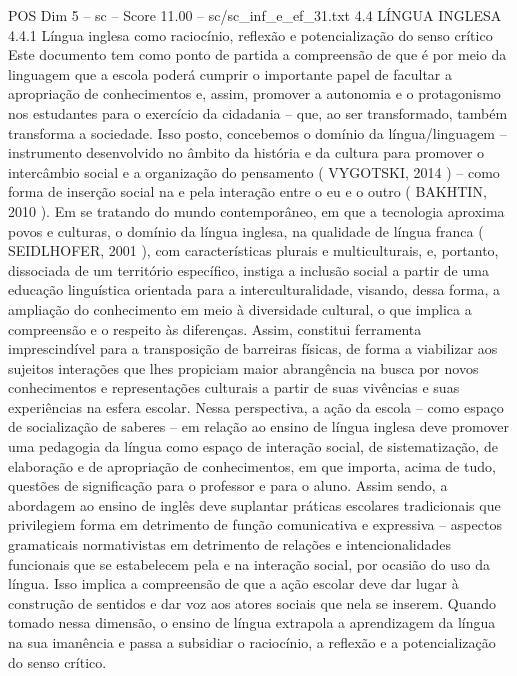 \begin{textsample}{POS Dim 5 – sc – Score 11.00 – sc/sc\_inf\_e\_ef\_31.txt}  \label{ex:f5_pos_031}
4.4 LÍNGUA INGLESA 4.4.1 Língua inglesa como raciocínio, reflexão e potencialização do senso crítico Este documento tem como ponto de partida a compreensão de que é por meio da linguagem que a escola poderá cumprir o importante papel de facultar a apropriação de conhecimentos e, assim, promover a autonomia e o protagonismo nos estudantes para o exercício da cidadania – que, ao ser transformado, também transforma a sociedade.
Isso posto, concebemos o domínio da língua/linguagem – instrumento desenvolvido no âmbito da história e da cultura para promover o intercâmbio social e a organização do pensamento ( VYGOTSKI, 2014 ) – como forma de inserção social na e pela interação entre o eu e o outro ( BAKHTIN, 2010 ).
Em se tratando do mundo contemporâneo, em que a tecnologia aproxima povos e culturas, o domínio da língua inglesa, na qualidade de língua franca ( SEIDLHOFER, 2001 ), com características plurais e multiculturais, e, portanto, dissociada de um território específico, instiga a inclusão social a partir de uma educação linguística orientada para a interculturalidade, visando, dessa forma, a ampliação do conhecimento em meio à diversidade cultural, o que implica a compreensão e o respeito às diferenças.
Assim, constitui ferramenta imprescindível para a transposição de barreiras físicas, de forma a viabilizar aos sujeitos interações que lhes propiciam maior abrangência na busca por novos conhecimentos e representações culturais a partir de suas vivências e suas experiências na esfera escolar.
Nessa perspectiva, a ação da escola – como espaço de socialização de saberes – em relação ao ensino de língua inglesa deve promover uma pedagogia da língua como espaço de interação social, de sistematização, de elaboração e de apropriação de conhecimentos, em que importa, acima de tudo, questões de significação para o professor e para o aluno.
Assim sendo, a abordagem ao ensino de inglês deve suplantar práticas escolares tradicionais que privilegiem forma em detrimento de função comunicativa e expressiva – aspectos gramaticais normativistas em detrimento de relações e intencionalidades funcionais que se estabelecem pela e na interação social, por ocasião do uso da língua.
Isso implica a compreensão de que a ação escolar deve dar lugar à construção de sentidos e dar voz aos atores sociais que nela se inserem.
Quando tomado nessa dimensão, o ensino de língua extrapola a aprendizagem da língua na sua imanência e passa a subsidiar o raciocínio, a reflexão e a potencialização do senso crítico.

\end{textsample}

